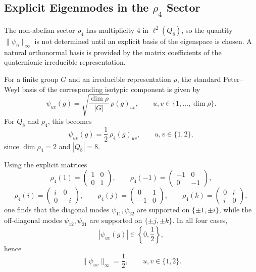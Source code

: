 \subsection{Explicit Eigenmodes in the $\rho_4$ Sector}
  \label{subsec:explicit-rho4}

  The non-abelian sector $\rho_4$ has multiplicity $4$ in $\ell^2(Q_8)$, so the
  quantity $\|\psi_n\|_\infty$ is not determined until an explicit basis of the
  eigenspace is chosen.
  A natural orthonormal basis is provided by the matrix coefficients of the
  quaternionic irreducible representation.

  For a finite group $G$ and an irreducible representation $\rho$, the standard
  Peter--Weyl basis of the corresponding isotypic component is given by
  \begin{equation}
    \psi_{uv}(g)
    =
    \sqrt{\frac{\dim \rho}{|G|}}\,\rho(g)_{uv},
    \qquad
    u,v \in \{1,\dots,\dim \rho\}.
  \end{equation}
  For $Q_8$ and $\rho_4$, this becomes
  \begin{equation}
    \psi_{uv}(g)
    =
    \frac{1}{2}\,\rho_4(g)_{uv},
    \qquad
    u,v \in \{1,2\},
  \end{equation}
  since $\dim \rho_4 = 2$ and $|Q_8| = 8$.

  Using the explicit matrices
  \begin{equation}
    \rho_4(1)=
    \begin{pmatrix}
      1 & 0 \\
      0 & 1
    \end{pmatrix},
    \qquad
    \rho_4(-1)=
    \begin{pmatrix}
      -1 & 0 \\
      0 & -1
    \end{pmatrix},
  \end{equation}
  \begin{equation}
    \rho_4(i)=
    \begin{pmatrix}
      i & 0 \\
      0 & -i
    \end{pmatrix},
    \qquad
    \rho_4(j)=
    \begin{pmatrix}
      0 & 1 \\
      -1 & 0
    \end{pmatrix},
    \qquad
    \rho_4(k)=
    \begin{pmatrix}
      0 & i \\
      i & 0
    \end{pmatrix},
  \end{equation}
  one finds that the diagonal modes $\psi_{11}, \psi_{22}$ are supported on
  $\{\pm 1, \pm i\}$, while the off-diagonal modes $\psi_{12}, \psi_{21}$ are
  supported on $\{\pm j, \pm k\}$.
  In all four cases,
  \begin{equation}
    |\psi_{uv}(g)| \in \left\{0,\frac{1}{2}\right\},
  \end{equation}
  hence
  \begin{equation}
    \|\psi_{uv}\|_\infty = \frac{1}{2},
    \qquad
    u,v \in \{1,2\}.
  \end{equation}


